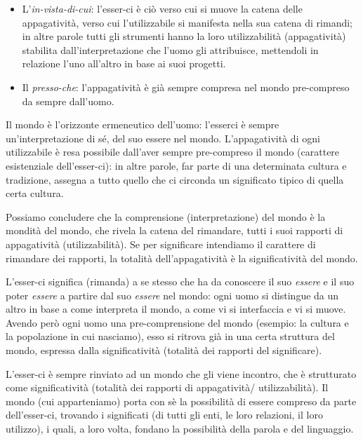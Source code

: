 \documentclass[a4paper,12pt,oneside]{article}%
\begin{document}
\begin{itemize}
	\item L'\textit{in-vista-di-cui}: l'esser-ci è ciò verso cui si muove la catena delle appagatività, verso cui l'utilizzabile si manifesta nella sua catena di rimandi; in altre parole tutti gli strumenti hanno la loro utilizzabilità (appagatività) stabilita dall'interpretazione che l'uomo gli attribuisce, mettendoli in relazione l'uno all'altro in base ai suoi progetti.
	\item Il \textit{presso-che}: l'appagatività è già sempre compresa nel mondo pre-compreso da sempre dall'uomo.
\end{itemize} 

Il mondo è l'orizzonte ermeneutico dell'uomo: l'esserci è sempre un'interpretazione di sé, del suo essere nel mondo. L'appagatività di ogni utilizzabile è resa possibile dall'aver sempre pre-compreso il mondo (carattere esistenziale dell'esser-ci): in altre parole, far parte di una determinata cultura e tradizione, assegna a tutto quello che ci circonda un significato tipico di quella certa cultura.

Possiamo concludere che la comprensione (interpretazione) del mondo è la mondità del mondo, che rivela la catena del rimandare, tutti i suoi rapporti di appagatività (utilizzabilità). Se per significare intendiamo il carattere di rimandare dei rapporti, la totalità dell'appagatività è la significatività del mondo.

L'esser-ci significa (rimanda) a se stesso che ha da conoscere il suo \textit{essere} e il suo poter \textit{essere} a partire dal suo \textit{essere} nel mondo: ogni uomo si distingue da un altro in base a come interpreta il mondo, a come vi si interfaccia e vi si muove. Avendo però ogni uomo una pre-comprensione del mondo (esempio: la cultura e la popolazione in cui nasciamo), esso si ritrova già in una certa struttura del mondo, espressa dalla significatività (totalità dei rapporti del significare).

L'esser-ci è sempre rinviato ad un mondo che gli viene incontro, che è strutturato come significatività (totalità dei rapporti di appagatività/ utilizzabilità). Il mondo (cui apparteniamo) porta con sè la possibilità di essere compreso da parte dell'esser-ci, trovando i significati (di tutti gli enti, le loro relazioni, il loro utilizzo), i quali, a loro volta, fondano la possibilità della parola e del linguaggio.
\end{document}
